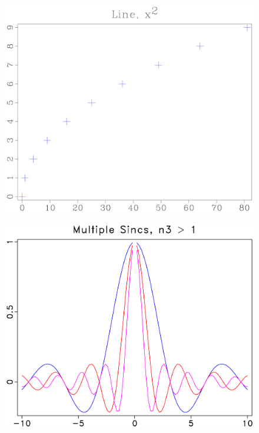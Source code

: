 \begin{frame}
  \begin{figure}
  \includegraphics[scale=0.25]{plot/Fig/sqline.pdf}
  \end{figure}
\end{frame}

\begin{frame}
  \begin{figure}
  \includegraphics[scale=0.25]{plot/Fig/msincs.pdf}
  \end{figure}
\end{frame}

